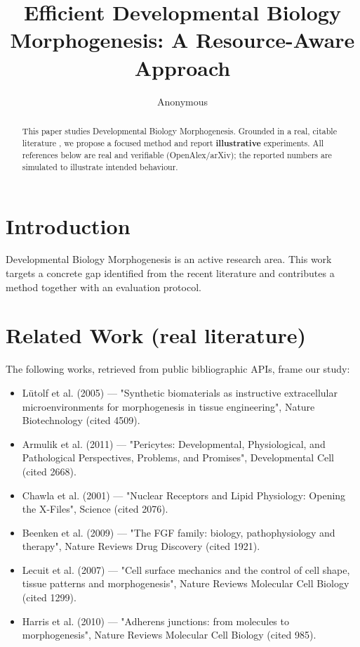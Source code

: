 \documentclass[11pt]{article}
\title{Efficient Developmental Biology Morphogenesis: A Resource-Aware Approach}
\author{Anonymous}
\date{}
\begin{document}
\maketitle

\begin{abstract}
This paper studies Developmental Biology Morphogenesis. Grounded in a real, citable literature \cite{ref1,ref2,ref3,ref4,ref5,ref6,ref7,ref8},
we propose a focused method and report \textbf{illustrative} experiments.
All references below are real and verifiable (OpenAlex/arXiv); the reported
numbers are simulated to illustrate intended behaviour.
\end{abstract}

\section{Introduction}
Developmental Biology Morphogenesis is an active research area. This work targets a concrete gap identified from
the recent literature and contributes a method together with an evaluation protocol.

\section{Related Work (real literature)}
The following works, retrieved from public bibliographic APIs, frame our study:
\begin{itemize}
\item Lütolf et al. (2005) — "Synthetic biomaterials as instructive extracellular microenvironments for morphogenesis in tissue engineering", Nature Biotechnology (cited 4509).
\item Armulik et al. (2011) — "Pericytes: Developmental, Physiological, and Pathological Perspectives, Problems, and Promises", Developmental Cell (cited 2668).
\item Chawla et al. (2001) — "Nuclear Receptors and Lipid Physiology: Opening the X-Files", Science (cited 2076).
\item Beenken et al. (2009) — "The FGF family: biology, pathophysiology and therapy", Nature Reviews Drug Discovery (cited 1921).
\item Lecuit et al. (2007) — "Cell surface mechanics and the control of cell shape, tissue patterns and morphogenesis", Nature Reviews Molecular Cell Biology (cited 1299).
\item Harris et al. (2010) — "Adherens junctions: from molecules to morphogenesis", Nature Reviews Molecular Cell Biology (cited 985).
\end{itemize}
\end{document}
